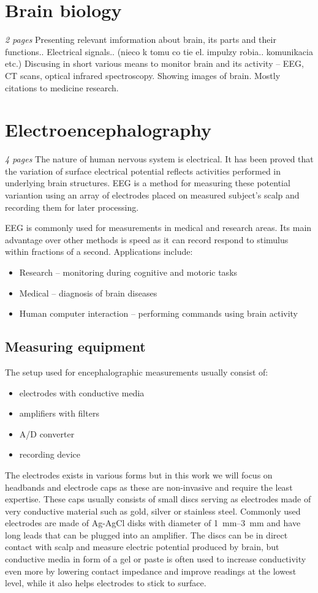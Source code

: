 \section{Brain biology}
\emph{2 pages}
Presenting relevant imformation about brain, its parts and their functions..
Electrical signals..  (nieco k tomu co tie el. impulzy robia.. komunikacia etc.)
Discusing in short various means to monitor brain and its activity -- EEG, 
CT scans, optical infrared spectroscopy. Showing images of brain.
Mostly citations to medicine research.

\section{Electroencephalography}
\emph{4 pages}
The nature of human nervous system is electrical. It has been proved that the
variation of surface electrical potential reflects activities performed in
underlying brain structures. EEG is a method for measuring these potential
variantion using an array of electrodes placed on measured subject's scalp and
recording them for later processing.\cite{eegClass}

EEG is commonly used for measurements in medical and research areas. Its main
advantage over other methods is speed as it can record respond to stimulus
within fractions of a second.\cite{eegFund}
Applications include:
\begin{itemize}
  \item Research -- monitoring during cognitive and motoric tasks
  \item Medical -- diagnosis of brain diseases
  \item Human computer interaction -- performing commands using brain activity  
\end{itemize}

\subsection{Measuring equipment}
The setup used for encephalographic measurements usually consist of: 
\begin{itemize}
  \item electrodes with conductive media
  \item amplifiers with filters
  \item A/D converter
  \item recording device
\end{itemize}
The electrodes exists in various forms but in this work we will focus on
headbands and electrode caps as these are non-invasive and require the least
expertise. These caps usually consists of small discs serving as electrodes made
of very conductive material such as gold, silver or stainless steel. Commonly
used electrodes are made of Ag-AgCl disks with diameter of \SIrange[range-units
= single]{1}{3}{\mm} and have long leads that can be plugged into an
amplifier. \cite{eegFund} The discs can be in direct contact with scalp and
measure electric potential produced by brain, but conductive media in form of a
gel or paste is often used to increase conductivity even more by lowering
contact impedance and improve readings at the lowest level, while it also helps
electrodes to stick to surface.


